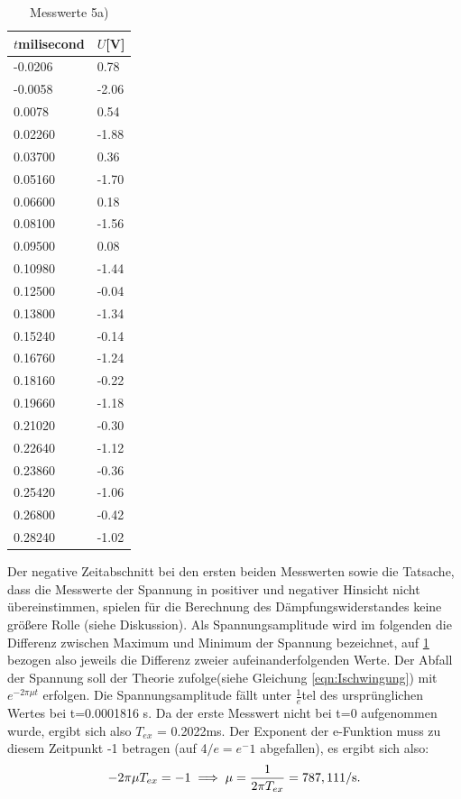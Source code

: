 \begin{table}
\noindent
\centering
\caption{Messwerte 5a)}
\label{tab:5a}
\begin{tabular}{ll}
\toprule
{$t$\si{milisecond}} & {$U$[V]} \\
\midrule
-0.0206 & 0.78 \\
-0.0058 & -2.06 \\
0.0078 & 0.54 \\
0.02260 & -1.88 \\
0.03700 & 0.36 \\
0.05160 & -1.70 \\
0.06600 & 0.18 \\
0.08100 & -1.56 \\
0.09500 & 0.08 \\
0.10980 & -1.44 \\
0.12500 & -0.04 \\
0.13800 & -1.34 \\
0.15240 & -0.14 \\
0.16760 & -1.24 \\
0.18160 & -0.22 \\
0.19660 & -1.18 \\
0.21020 & -0.30 \\
0.22640 & -1.12 \\
0.23860 & -0.36 \\
0.25420 & -1.06 \\
0.26800 & -0.42 \\
0.28240 & -1.02 \\
\bottomrule
\end{tabular}
\end{table}

Der negative Zeitabschnitt bei den ersten beiden Messwerten
sowie die Tatsache, dass
die Messwerte der Spannung
in positiver und negativer Hinsicht nicht übereinstimmen,
spielen für die Berechnung des Dämpfungswiderstandes keine größere Rolle
(siehe Diskussion).
Als Spannungsamplitude wird im folgenden die Differenz zwischen Maximum und
Minimum der Spannung bezeichnet, auf \ref{tab:5a} bezogen also jeweils die
Differenz zweier aufeinanderfolgenden Werte.
Der Abfall der Spannung soll der Theorie
zufolge(siehe Gleichung \ref{eqn:Ischwingung})
mit $e^{-2\pi\mu t}$ erfolgen. Die Spannungsamplitude fällt unter
$\frac{1}{e}$tel des ursprünglichen Wertes bei t=0.0001816 s.
Da der erste Messwert
nicht bei t=0 aufgenommen wurde, ergibt sich also $T_{ex}$ = 0.2022ms.
Der Exponent der e-Funktion muss zu diesem Zeitpunkt -1 betragen (auf 4$/e=e^-1$
abgefallen), es ergibt sich also:
\begin{equation}
  -2\pi\mu T_{ex} = -1 \\
  \implies \mu = \frac{1}{2\pi T_{ex}} = 787,11 \text{1/s.}
\end{equation}

